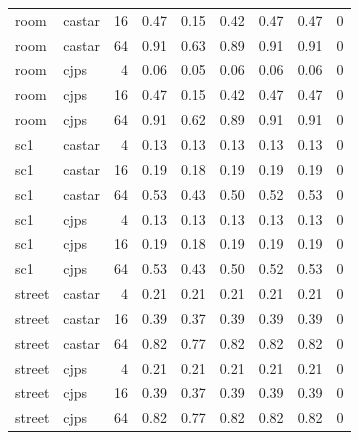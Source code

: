 \begin{tabular}{llr r rrrr r}
room & castar & 16 & 0.47 & 0.15 & 0.42 & 0.47 & 0.47 & 0\\
room & castar & 64 & 0.91 & 0.63 & 0.89 & 0.91 & 0.91 & 0\\
room & cjps & 4 & 0.06 & 0.05 & 0.06 & 0.06 & 0.06 & 0\\
room & cjps & 16 & 0.47 & 0.15 & 0.42 & 0.47 & 0.47 & 0\\
room & cjps & 64 & 0.91 & 0.62 & 0.89 & 0.91 & 0.91 & 0\\
sc1 & castar & 4 & 0.13 & 0.13 & 0.13 & 0.13 & 0.13 & 0\\
sc1 & castar & 16 & 0.19 & 0.18 & 0.19 & 0.19 & 0.19 & 0\\
sc1 & castar & 64 & 0.53 & 0.43 & 0.50 & 0.52 & 0.53 & 0\\
sc1 & cjps & 4 & 0.13 & 0.13 & 0.13 & 0.13 & 0.13 & 0\\
sc1 & cjps & 16 & 0.19 & 0.18 & 0.19 & 0.19 & 0.19 & 0\\
sc1 & cjps & 64 & 0.53 & 0.43 & 0.50 & 0.52 & 0.53 & 0\\
street & castar & 4 & 0.21 & 0.21 & 0.21 & 0.21 & 0.21 & 0\\
street & castar & 16 & 0.39 & 0.37 & 0.39 & 0.39 & 0.39 & 0\\
street & castar & 64 & 0.82 & 0.77 & 0.82 & 0.82 & 0.82 & 0\\
street & cjps & 4 & 0.21 & 0.21 & 0.21 & 0.21 & 0.21 & 0\\
street & cjps & 16 & 0.39 & 0.37 & 0.39 & 0.39 & 0.39 & 0\\
street & cjps & 64 & 0.82 & 0.77 & 0.82 & 0.82 & 0.82 & 0\\
\bottomrule\end{tabular}

